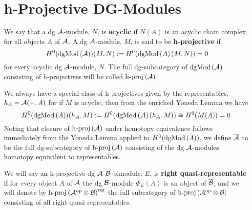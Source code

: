 \section{h-Projective DG-Modules}
We say that a dg \(\mathcal{A}\)-module, \(N\), is \textbf{acyclic} if \(N(A)\) is an acyclic chain complex for all objects \(A\) of \(\mathcal{A}\).
A dg \(\mathcal{A}\)-module, \(M\), is said to be \textbf{h-projective} if
\[H^0(\operatorname{dgMod}\left(\mathcal{A}\right))(M,N) := H^0(\operatorname{dgMod}\left(A\right)(M,N)) = 0\]
for every acyclic dg \(\mathcal{A}\)-module, \(N\).
The full dg-subcategory of \(\operatorname{dgMod}\left(\mathcal{A}\right)\) consisting of h-projectives will be called \(\operatorname{h-proj}\left(\mathcal{A}\right)\).

We always have a special class of h-projectives given by the representables, \(h_A = \mathcal{A}(-, A)\) for if \(M\) is acyclic, then from the enriched Yoneda Lemma we have
\[H^0(\operatorname{dgMod}\left(A\right))(h_A,M) := H^0(\operatorname{dgMod}\left(\mathcal{A}\right)(h_A, M)) \cong H^0(M(A)) = 0.\]
Noting that closure of \(\operatorname{h-proj}\left(\mathcal{A}\right)\) under homotopy equivalence follows immediately from the Yoneda Lemma applied to \(H^0(\operatorname{dgMod}\left(A\right))\), we define \(\overline{\mathcal{A}}\) to be the full dg-subcategory of \(\operatorname{h-proj}\left(\mathcal{A}\right)\) consisting of the dg \(\mathcal{A}\)-modules homotopy equivalent to representables.

We will say an h-projective dg \(\mathcal{A}\)-\(\mathcal{B}\)-bimodule, \(E\), is \textbf{right quasi-representable} if for every object \(A\) of \(\mathcal{A}\) the dg \(\mathcal{B}\)-module \(\Phi_E(A)\) is an object of \(\overline{\mathcal{B}}\), and we will denote by \(\operatorname{h-proj}\left(\mathcal{A}^{\operatorname{op}} \otimes \mathcal{B}\right)^{\operatorname{rqr}}\) the full subcategory of \(\operatorname{h-proj}\left(\mathcal{A}^{\operatorname{op}} \otimes \mathcal{B}\right)\) consisting of all right quasi-representables.

